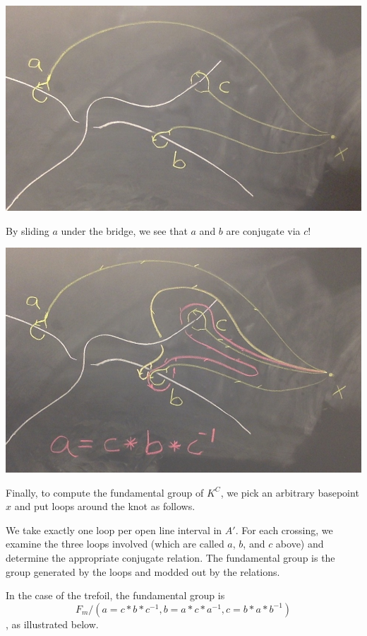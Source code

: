 \documentclass[11pt,leqno,oneside]{amsart}
\numberwithin{thm}{section}
\begin{document}
\begin{example}
  \includegraphics[scale=0.2]{images/mountains.jpg}

  By sliding $a$ under the bridge, we see that $a$ and $b$ are conjugate via $c$!

  \includegraphics[scale=0.2]{images/mountains-with-explanation.jpg}

  Finally, to compute the fundamental group of $K^C$, we pick an arbitrary basepoint $x$ and put loops around the knot as follows.

  We take exactly one loop per open line interval in $A'$.  For each crossing, we examine the three loops involved (which are called $a$, $b$, and $c$ above) and determine the appropriate conjugate relation.  The fundamental group is the group generated by the loops and modded out by the relations.

  In the case of the trefoil, the fundamental group is $${F_m}/{(a=c*b*c^{-1}, b=a*c*a^{-1}, c=b*a*b^{-1})}$$, as illustrated below.


\end{example}
\end{document}
